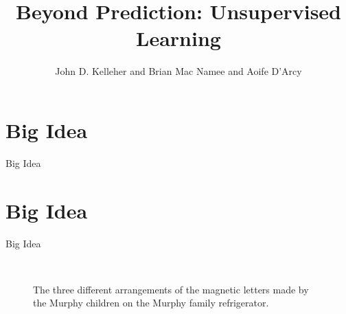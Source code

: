 \documentclass[xcolor={table}]{beamer}
\title{Beyond Prediction: Unsupervised Learning}
\author{John D. Kelleher and Brian Mac Namee and Aoife D'Arcy}
\institute{}
\date{}
\newcommand{\SectionSlide}[2][]{
	\ifthenelse{\isempty{#1}}
		{\section{#2}\begin{frame} \begin{center}\begin{huge}#2\end{huge}\end{center}\end{frame}}
		{\section[#1]{#2}\begin{frame} \begin{center}\begin{huge}#2\end{huge}\end{center}\end{frame}}
}
\begin{document}
\begin{frame}
	\titlepage
\end{frame}
\begin{frame}
	 \tableofcontents[hideallsubsections]
\end{frame}
\SectionSlide{Big Idea}



 \begin{frame} 
\begin{figure}[htb]
       \begin{centering}
			 ~ 
			 ~
			 ~
       \caption{The three different arrangements of the magnetic letters made by the Murphy children on the Murphy family refrigerator.}
       \label{fig:fridgeLetters}
       \end{centering}
\end{figure}
\end{frame} 
\end{document}
